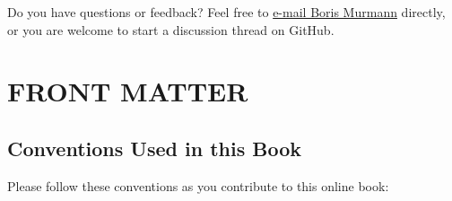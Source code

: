 \documentclass[
  11pt,
  letterpaper,
  abstract]{scrbook}
\begin{document}

Do you have questions or feedback? Feel free to
\href{mailto:bmurmann@hawaii.edu?subject=“COCOA”}{e-mail Boris Murmann}
directly, or you are welcome to start a discussion thread on GitHub.

\part{FRONT MATTER}

\chapter*{Conventions Used in this
Book}\label{conventions-used-in-this-book}


Please follow these conventions as you contribute to this online book:
\end{document}
